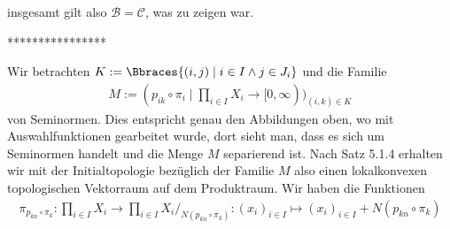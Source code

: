 \begin{solution}
insgesamt gilt also $\mathcal{B} = \mathcal{C}$, was zu zeigen war.

****************

Wir betrachten $K := \Bbraces{(i,j) \mid i \in I \land j \in J_i}$ und die Familie
\begin{align*}
    M := (p_{ik} \circ \pi_i \mid \prod_{i \in I} X_i \to [0, \infty))_{(i, k) \in K}
\end{align*}
von Seminormen. Dies entspricht genau den Abbildungen oben, wo mit Auswahlfunktionen gearbeitet wurde, dort sieht man, dass es sich um Seminormen handelt und die Menge $M$ separierend ist. Nach Satz 5.1.4 erhalten wir mit der Initialtopologie bezüglich der Familie $M$ also einen lokalkonvexen topologischen Vektorraum auf dem Produktraum. Wir haben die Funktionen
\begin{align*}
    \pi_{p_{kn} \circ \pi_k}: \prod_{i \in I} X_i \to \prod_{i \in I} X_i /_{N(p_{kn} \circ \pi_k)}: (x_i)_{i \in I} \mapsto (x_i)_{i \in I} + N(p_{kn} \circ \pi_k) 
\end{align*}

\end{solution}
